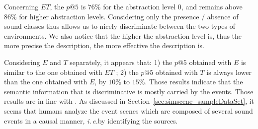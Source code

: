 \documentclass[12pt]{elsarticle}
\newcommand{\ie}{\emph{i.\,e.}}
\newcommand{\cf}{cf.}
\begin{document}

Concerning $ET$, the $p@5$ is $76\%$ for the abstraction level $0$, and remains above $86\%$ for higher abstraction levels. Considering only the presence / absence of sound classes thus allows us to nicely discriminate between the two types of environments. We also notice that the higher the abstraction level is, thus the more precise the description, the more effective the description is.


Considering $E$ and $T$ separately, it appears that: 1) the $p@5$ obtained with $E$ is similar to the one obtained with $ET$ ; 2) the $p@5$ obtained with $T$ is always lower than the one obtained with $E$, by $10\%$ to $15\%$. Those results indicate that the semantic information that is discriminative is mostly carried by the events. Those results are in line with \cite{maffiolo_caracterisation_1999}. As discussed in Section~\ref{sec:simscene_sampleDataSet}, it seems that humans analyze the event scenes which are composed of several sound events in a causal manner, \ie by identifying the sources.

\end{document}
